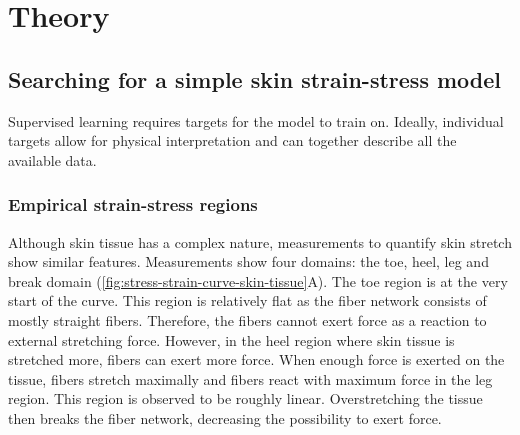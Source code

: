 \section{Theory}



\subsection{Searching for a simple skin strain-stress model}\label{subsec:skin_predictors}

Supervised learning requires targets for the model to train on.
Ideally, individual targets allow for physical interpretation and can together describe all the available data.

\subsubsection{Empirical strain-stress regions}
Although skin tissue has a complex nature, measurements to quantify skin stretch show similar features.
Measurements show four domains: the toe, heel, leg and break domain (\cref{fig:stress-strain-curve-skin-tissue}A).
The toe region is at the very start of the curve.
This region is relatively flat as the fiber network consists of mostly straight fibers.
Therefore, the fibers cannot exert force as a reaction to external stretching force.
However, in the heel region where skin tissue is stretched more, fibers can exert more force.
When enough force is exerted on the tissue, fibers stretch maximally and fibers react with maximum force in the leg region.
This region is observed to be roughly linear.
Overstretching the tissue then breaks the fiber network, decreasing the possibility to exert force.

